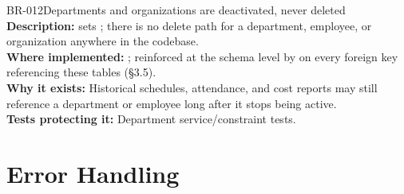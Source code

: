 \begin{businessrule}{BR-012}{Departments and organizations are deactivated, never deleted}
\textbf{Description:}  sets
; there is no delete path for a department,
employee, or organization anywhere in the codebase.\\
\textbf{Where implemented:} ;
reinforced at the schema level by  on every
foreign key referencing these tables (\S3.5).\\
\textbf{Why it exists:} Historical schedules, attendance, and cost
reports may still reference a department or employee long after it
stops being active.\\
\textbf{Tests protecting it:} Department service/constraint tests.
\end{businessrule}

\section{Error Handling}

